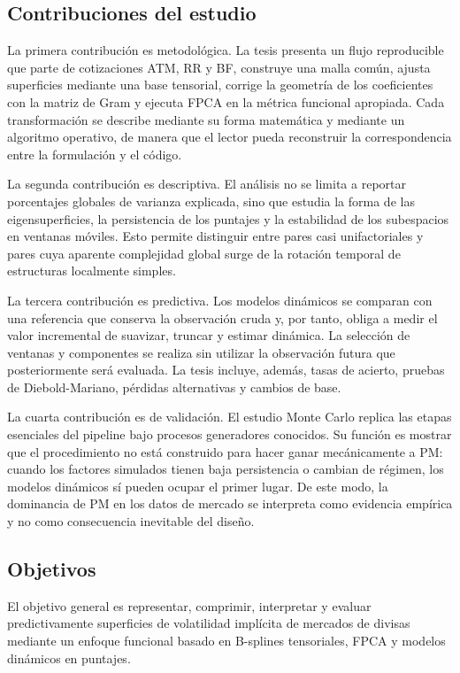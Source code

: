 \documentclass[a4paper,11pt]{article}
\newcommand{\SVIs}{superficies de volatilidad implícita}
\begin{document}
\subsection{Contribuciones del estudio}

La primera contribución es metodológica. La tesis presenta un flujo reproducible que parte de cotizaciones ATM, RR y BF, construye una malla común, ajusta superficies mediante una base tensorial, corrige la geometría de los coeficientes con la matriz de Gram y ejecuta FPCA en la métrica funcional apropiada. Cada transformación se describe mediante su forma matemática y mediante un algoritmo operativo, de manera que el lector pueda reconstruir la correspondencia entre la formulación y el código.

La segunda contribución es descriptiva. El análisis no se limita a reportar porcentajes globales de varianza explicada, sino que estudia la forma de las eigensuperficies, la persistencia de los puntajes y la estabilidad de los subespacios en ventanas móviles. Esto permite distinguir entre pares casi unifactoriales y pares cuya aparente complejidad global surge de la rotación temporal de estructuras localmente simples.

La tercera contribución es predictiva. Los modelos dinámicos se comparan con una referencia que conserva la observación cruda y, por tanto, obliga a medir el valor incremental de suavizar, truncar y estimar dinámica. La selección de ventanas y componentes se realiza sin utilizar la observación futura que posteriormente será evaluada. La tesis incluye, además, tasas de acierto, pruebas de Diebold-Mariano, pérdidas alternativas y cambios de base.

La cuarta contribución es de validación. El estudio Monte Carlo replica las etapas esenciales del pipeline bajo procesos generadores conocidos. Su función es mostrar que el procedimiento no está construido para hacer ganar mecánicamente a PM: cuando los factores simulados tienen baja persistencia o cambian de régimen, los modelos dinámicos sí pueden ocupar el primer lugar. De este modo, la dominancia de PM en los datos de mercado se interpreta como evidencia empírica y no como consecuencia inevitable del diseño.

\subsection{Objetivos}

El objetivo general es representar, comprimir, interpretar y evaluar predictivamente \SVIs{} de mercados de divisas mediante un enfoque funcional basado en B-splines tensoriales, FPCA y modelos dinámicos en puntajes.
\end{document}
